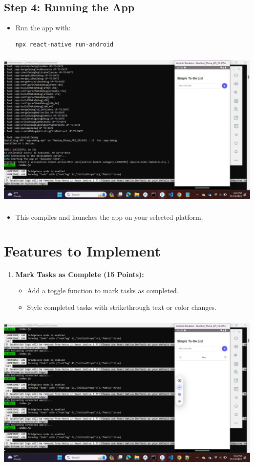 \documentclass{article}
\begin{document}
\subsection*{Step 4: Running the App}

\begin{itemize}
    \item Run the app with:
    \begin{lstlisting}[language=bash]
    npx react-native run-android
    \end{lstlisting}
\end{itemize}
\includegraphics[width=5.57813in,height=3.13391in]{media/image16.png}

\begin{itemize}
    \item This compiles and launches the app on your selected platform.
\end{itemize}

\section*{Features to Implement}

\begin{enumerate}
    \item \textbf{Mark Tasks as Complete (15 Points):}
    \begin{itemize}
        \item Add a toggle function to mark tasks as completed.
        \item Style completed tasks with strikethrough text or color changes.
    \end{itemize}
\end{enumerate}
\includegraphics[width=5.57813in,height=3.13391in]{media/image34.png}
    
\end{document}

